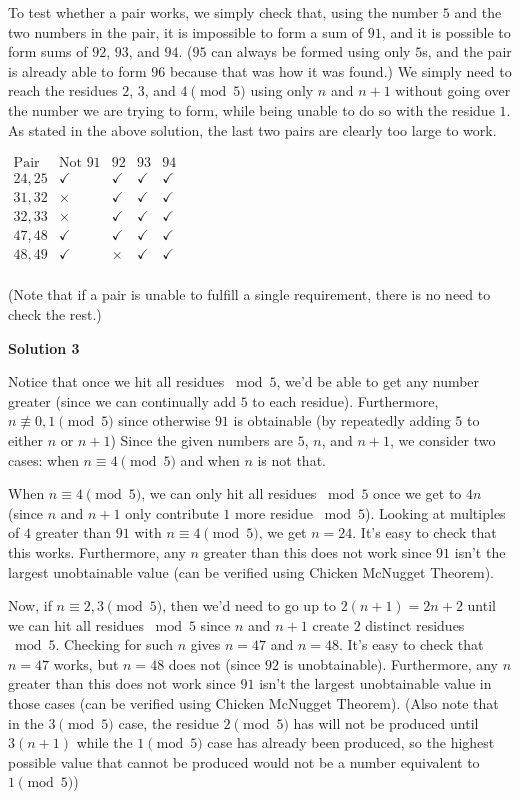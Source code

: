 \begin{enumerate}
 To test whether a pair works, we simply check that, using the number $5$ and the two numbers in the pair, it is impossible to form a sum of $91$, and it is possible to form sums of $92$, $93$, and $94$. ($95$ can always be formed using only $5$s, and the pair is already able to form $96$ because that was how it was found.) We simply need to reach the residues $2$, $3$, and $4$$\pmod{5}$ using only $n$ and $n+1$ without going over the number we are trying to form, while being unable to do so with the residue $1$. As stated in the above solution, the last two pairs are clearly too large to work.

 $\begin{array}{c|c|c|c|c} \text{Pair} & \text{Not }91 & 92 & 93 & 94 \\ \hline 24,25 & \checkmark & \checkmark & \checkmark & \checkmark \\ 31,32 & \times & \checkmark & \checkmark & \checkmark \\ 32,33 & \times & \checkmark & \checkmark & \checkmark \\ 47,48 & \checkmark & \checkmark & \checkmark & \checkmark \\ 48,49 & \checkmark & \times & \checkmark & \checkmark \\ \end{array}$

 (Note that if a pair is unable to fulfill a single requirement, there is no need to check the rest.)

 



\textbf{Solution 3}

Notice that once we hit all residues $\bmod 5$, we'd be able to get any number greater (since we can continually add $5$ to each residue). Furthermore, $n\not\equiv 0,1\pmod{5}$ since otherwise $91$ is obtainable (by repeatedly adding $5$ to either $n$ or $n+1$) Since the given numbers are $5$, $n$, and $n+1$, we consider two cases: when $n\equiv 4\pmod{5}$ and when $n$ is not that. 

 When $n\equiv 4 \pmod{5}$, we can only hit all residues $\bmod 5$ once we get to $4n$ (since $n$ and $n+1$ only contribute $1$ more residue $\bmod 5$). Looking at multiples of $4$ greater than $91$ with $n\equiv 4\pmod{5}$, we get $n=24$. It's easy to check that this works. Furthermore, any $n$ greater than this does not work since $91$ isn't the largest unobtainable value (can be verified using Chicken McNugget Theorem). 

 Now, if $n\equiv 2,3\pmod{5}$, then we'd need to go up to $2(n+1)=2n+2$ until we can hit all residues $\bmod 5$ since $n$ and $n+1$ create $2$ distinct residues $\bmod{5}$. Checking for such $n$ gives $n=47$ and $n=48$. It's easy to check that $n=47$ works, but $n=48$ does not (since $92$ is unobtainable). Furthermore, any $n$ greater than this does not work since $91$ isn't the largest unobtainable value in those cases (can be verified using Chicken McNugget Theorem). (Also note that in the $3 \pmod{5}$ case, the residue $2 \pmod{5}$ has will not be produced until $3(n+1)$ while the $1\pmod5$ case has already been produced, so the highest possible value that cannot be produced would not be a number equivalent to $1 \pmod5$)


\end{enumerate}
